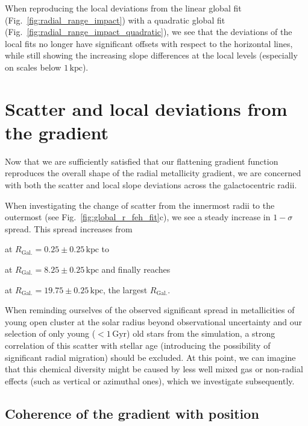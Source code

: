 \documentclass[fleqn,usenatbib]{mnras}
\begin{document}
When reproducing the local deviations from the linear global fit (Fig.~\ref{fig:radial_range_impact}) with a quadratic global fit (Fig.~\ref{fig:radial_range_impact_quadratic}), we see that the deviations of the local fits no longer have significant offsets with respect to the horizontal lines, while still showing the increasing slope differences at the local levels (especially on scales below $1\,\mathrm{kpc}$). 

\section{Scatter and local deviations from the gradient}
\label{sec:scatter_radial_metallicity_gradients}

Now that we are sufficiently satisfied that our flattening gradient function reproduces the overall shape of the radial metallicity gradient, we are concerned with both the scatter and local slope deviations across the galactocentric radii.

When investigating the change of scatter from the innermost radii to the outermost (see Fig.~\ref{fig:global_r_feh_fit}c), we see a steady increase in $1-\sigma$ spread. This spread increases from
\begin{description}
    \item  at $R_\mathrm{Gal.} = 0.25 \pm 0.25\,\mathrm{kpc}$ to
    \item  at $R_\mathrm{Gal.} = 8.25 \pm 0.25\,\mathrm{kpc}$ and finally reaches 
     \item  at $R_\mathrm{Gal.} = 19.75 \pm 0.25\,\mathrm{kpc}$, the largest $R_\mathrm{Gal.}$.
\end{description}

When reminding ourselves of the observed significant spread in metallicities of young open cluster at the solar radius beyond observational uncertainty \citep[e.g.][]{Donor2020, Spina2021} and our selection of only young ($<1\,\mathrm{Gyr}$) old stars from the simulation, a strong correlation of this scatter with stellar age (introducing the possibility of significant radial migration) should be excluded. At this point, we can imagine that this chemical diversity might be caused by less well mixed gas or non-radial effects (such as vertical or azimuthal ones), which we investigate subsequently.

\subsection{Coherence of the gradient with position}
\label{sec:coherence_position_radial_metallicity_gradients}
\end{document}
